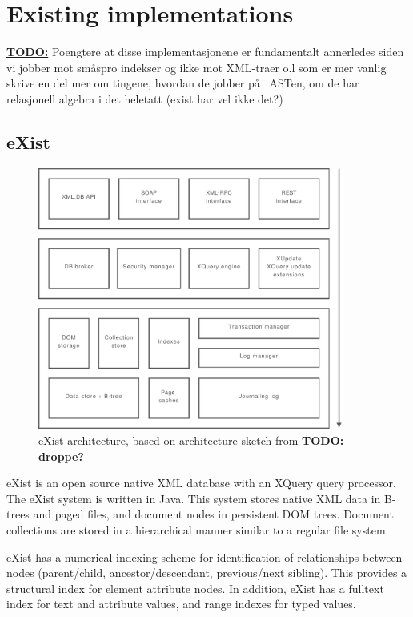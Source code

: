 \section{Existing implementations}
\label{sect:existing_implementations}

\textbf{\underline{\LARGE TODO:}}
Poengtere at disse implementasjonene er fundamentalt annerledes siden vi jobber
mot sm\aa spro indekser og ikke mot XML-traer o.l som er mer vanlig skrive en 
del mer om tingene, hvordan de jobber p\aa~ ASTen, om de har relasjonell algebra 
i det heletatt (exist har vel ikke det?)

\subsection{eXist}
\begin{figure}[h]
  \centering
    \includegraphics[width=0.9\textwidth]{diagrams/exist_arch}
  \caption[eXist architecture]{eXist architecture, based on architecture sketch
  from \cite{exist_indexdriven} \textbf{\Large TODO: droppe?}}
\end{figure}
eXist\cite{exist_doc} is an open source native XML database with an XQuery
query processor. The eXist system is written in Java. This system stores native
XML data in B-trees and paged files, and document nodes
in persistent DOM trees\cite{exist_factsheet}. Document collections are stored
in a hierarchical manner similar to a regular file system.

eXist has a numerical indexing scheme for identification of relationships
between nodes (parent/child, ancestor/descendant, previous/next sibling). This
provides a structural index for element attribute nodes. In addition, eXist has
a fulltext index for text and attribute values, and range indexes for typed
values.

